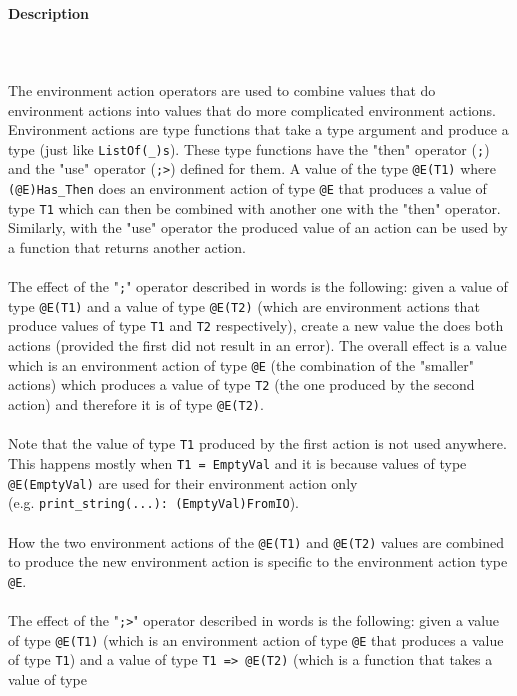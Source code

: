 \documentclass{article}
\def\pend{\mbox{}\\\\}
\begin{document}
\newpage
\paragraph{Description}\pend
The environment action operators are used to combine values that do environment
actions into values that do more complicated environment actions. Environment
actions are type functions that take a type argument and produce a type (just
like \verb|ListOf(_)s|). These type functions have the "then" operator (\verb|;|)
and the "use" operator (\verb|;>|) defined for them.  A value of the type
\verb|@E(T1)| where \verb|(@E)Has_Then| does an environment action of type
\verb|@E| that produces a value of type \verb|T1| which can then be
combined with another one with the "then" operator. Similarly, with the "use"
operator the produced value of an action can be used by a function that returns
another action.
\\\\
The effect of the "\verb|;|" operator described in words is the following:
given a value of type \verb|@E(T1)| and a value of type \verb|@E(T2)|
(which are environment actions that produce values of type \verb|T1| and
\verb|T2| respectively), create a new value the does both actions (provided
the first did not result in an error).  The overall effect is a value which is
an environment action of type \verb|@E| (the combination of the "smaller"
actions) which produces a value of type \verb|T2| (the one produced by the
second action) and therefore it is of type \verb|@E(T2)|.
\\\\
Note that the value of type \verb|T1| produced by the first action is not
used anywhere. This happens mostly when \verb|T1 = EmptyVal| and it is
because values of type \verb|@E(EmptyVal)| are used for their environment
action only \\(e.g. \verb|print_string(...): (EmptyVal)FromIO|).
\\\\
How the two environment actions of the \verb|@E(T1)| and \verb|@E(T2)|
values are combined to produce the new environment action is specific to the
environment action type \verb|@E|.
\\\\
The effect of the "\verb|;>|" operator described in words is the following:
given a value of type \verb|@E(T1)| (which is an environment action of type
\verb|@E| that produces a value of type \verb|T1|) and a value of type
\verb|T1 => @E(T2)| (which is a function that takes a value of type
\end{document}
